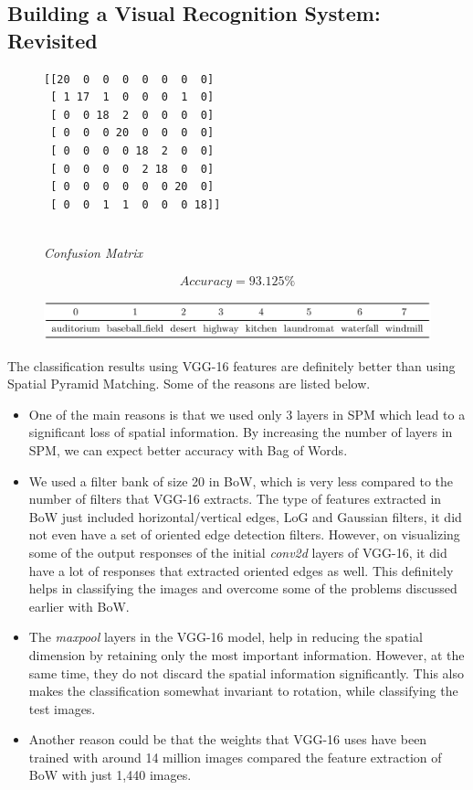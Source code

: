 \documentclass[a4paper]{article}
\begin{document}
\subsection{Building a Visual Recognition System: Revisited}
\begin{figure}[!ht]
\centering
\begin{BVerbatim}
[[20  0  0  0  0  0  0  0]
 [ 1 17  1  0  0  0  1  0]
 [ 0  0 18  2  0  0  0  0]
 [ 0  0  0 20  0  0  0  0]
 [ 0  0  0  0 18  2  0  0]
 [ 0  0  0  0  2 18  0  0]
 [ 0  0  0  0  0  0 20  0]
 [ 0  0  1  1  0  0  0 18]]
\end{BVerbatim}
\bigskip
\\
\textit{Confusion Matrix}
\end{figure}

\begin{equation*}
    Accuracy = 93.125\%
\end{equation*}

\begin{figure}[!ht]
    \centering
    \includegraphics[width=\textwidth]{labels}
\end{figure}

The classification results using VGG-16 features are definitely better than using Spatial Pyramid Matching. Some of the reasons are listed below.
\begin{itemize}
    \item One of the main reasons is that we used only 3 layers in SPM which lead to a significant loss of spatial information. By increasing the number of layers in SPM, we can expect better accuracy with Bag of Words.  
    \item We used a filter bank of size 20 in BoW, which is very less compared to the number of filters that VGG-16 extracts. The type of features extracted in BoW just included horizontal/vertical edges, LoG and Gaussian filters, it did not even have a set of oriented edge detection filters. However, on visualizing some of the output responses of the initial \textit{conv2d} layers of VGG-16, it did have a lot of responses that extracted oriented edges as well. This definitely helps in classifying the images and overcome some of the problems discussed earlier with BoW.
    \item The \textit{maxpool} layers in the VGG-16 model, help in reducing the spatial dimension by retaining only the most important information. However, at the same time, they do not discard the spatial information significantly. This also makes the classification somewhat invariant to rotation, while classifying the test images.
    \item Another reason could be that the weights that VGG-16 uses have been trained with around 14 million images compared the feature extraction of BoW with just 1,440 images.
\end{itemize}
\end{document}
